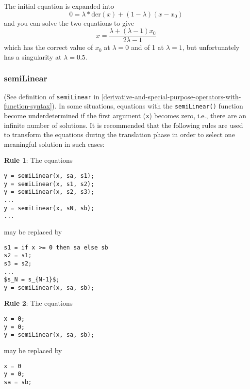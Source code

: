 \begin{nonnormative}
The initial equation is expanded into
$$ 0 = \lambda*\mathrm{der}(x)+(1-\lambda)(x-x_0)$$
and you can solve the two equations to give
$$ x=\frac{\lambda+(\lambda-1)x_0}{2\lambda-1}$$
which has the correct value of $x_0$ at $\lambda = 0$ and of 1 at $\lambda= 1$, but unfortunately has a singularity at $\lambda = 0.5 $.
\end{nonnormative}


\subsubsection{semiLinear}

(See definition of \lstinline!semiLinear! in \autoref{derivative-and-special-purpose-operators-with-function-syntax}). In some situations,
equations with the \lstinline!semiLinear()! function become underdetermined if the
first argument (\lstinline!x!) becomes zero, i.e., there are an infinite number of
solutions. It is recommended that the following rules are used to
transform the equations during the translation phase in order to select
one meaningful solution in such cases:

\textbf{Rule 1}: The equations

\begin{lstlisting}[language=modelica]
y = semiLinear(x, sa, s1);
y = semiLinear(x, s1, s2);
y = semiLinear(x, s2, s3);
...
y = semiLinear(x, sN, sb);
...
\end{lstlisting}

may be replaced by
\begin{lstlisting}[language=modelica, mathescape=true]
s1 = if x >= 0 then sa else sb
s2 = s1;
s3 = s2;
...
$s_N = s_{N-1}$;
y = semiLinear(x, sa, sb);
\end{lstlisting}

\textbf{Rule 2}: The equations
\begin{lstlisting}[language=modelica]
x = 0;
y = 0;
y = semiLinear(x, sa, sb);
\end{lstlisting}

may be replaced by
\begin{lstlisting}[language=modelica]
x = 0
y = 0;
sa = sb;
\end{lstlisting}

